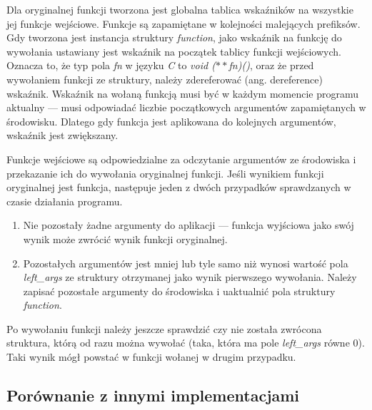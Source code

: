 \documentclass[declaration,shortabstract]{iithesis}
\begin{document}
Dla oryginalnej funkcji tworzona jest globalna tablica wskaźników na wszystkie 
jej funkcje wejściowe. Funkcje są zapamiętane w kolejności malejących prefiksów.
Gdy tworzona jest instancja struktury \textit{function}, jako wskaźnik na 
funkcję do wywołania ustawiany jest wskaźnik na początek tablicy funkcji 
wejściowych. Oznacza to, że typ pola \textit{fn} w języku \textit{C} to 
\textit{void ($\ast\ast$fn)()}, oraz że przed wywołaniem funkcji ze struktury,
należy zdereferować (ang. dereference) wskaźnik. Wskaźnik na wołaną funkcją 
musi być w każdym momencie programu aktualny --- musi odpowiadać liczbie 
początkowych argumentów zapamiętanych w środowisku. Dlatego gdy 
funkcja jest aplikowana do kolejnych argumentów, wskaźnik jest zwiększany. 


Funkcje wejściowe są odpowiedzialne za odczytanie argumentów ze środowiska i 
przekazanie ich do wywołania oryginalnej funkcji. Jeśli wynikiem funkcji 
oryginalnej jest funkcja, następuje jeden z dwóch przypadków sprawdzanych w
czasie działania programu.

\begin{enumerate}
  \item Nie pozostały żadne argumenty do aplikacji ---
  funkcja wyjściowa jako swój wynik może zwrócić wynik funkcji oryginalnej.
  \item Pozostałych argumentów jest mniej lub tyle samo niż wynosi 
  wartość pola \textit{left\_args} ze struktury otrzymanej jako wynik 
  pierwszego wywołania.
  Należy zapisać pozostałe argumenty do środowiska i uaktualnić pola struktury 
  \textit{function}.
\end{enumerate}

Po wywołaniu funkcji należy jeszcze sprawdzić czy nie została zwrócona 
struktura, którą od razu można wywołać 
(taka, która ma pole \textit{left\_args} 
równe $0$). Taki wynik mógł powstać w funkcji wołanej w drugim przypadku.

\subsection{Porównanie z innymi implementacjami}
\end{document}
